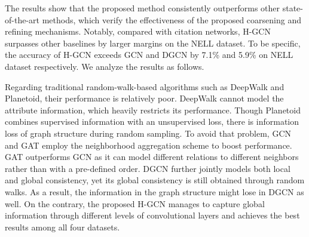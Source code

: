 \documentclass{article}
\begin{document}
\begin{table}
	\centering
	\caption{Results of node classification in terms of accuracy}
	\label{tab:results}
\end{table}

The results show that the proposed method consistently outperforms other state-of-the-art methods, which verify the effectiveness of the proposed coarsening and refining mechanisms. Notably, compared with citation networks, H-GCN surpasses other baselines by larger margins on the NELL dataset. To be specific, the accuracy of H-GCN exceeds GCN and DGCN by 7.1\% and 5.9\% on NELL dataset respectively. We analyze the results as follows.

Regarding traditional random-walk-based algorithms such as DeepWalk and Planetoid, their performance is relatively poor. DeepWalk cannot model the attribute information, which heavily restricts its performance. Though Planetoid combines supervised information with an unsupervised loss, there is information loss of graph structure during random sampling. To avoid that problem, GCN and GAT employ the neighborhood aggregation scheme to boost performance. GAT outperforms GCN as it can model different relations to different neighbors rather than with a pre-defined order. DGCN further jointly models both local and global consistency, yet its global consistency is still obtained through random walks. As a result, the information in the graph structure might lose in DGCN as well. On the contrary, the proposed H-GCN manages to capture global information through different levels of convolutional layers and achieves the best results among all four datasets.
\end{document}

